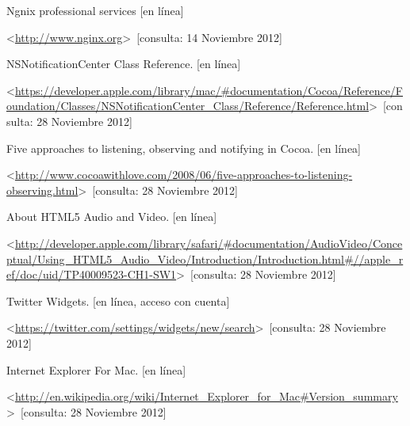 \begin{thebibliography}{99}
\begin{sloppypar}
Ngnix professional services [en línea]\

\textless \url{http://www.nginx.org}\textgreater \ [consulta: 14 Noviembre 2012]

NSNotificationCenter Class Reference. [en línea]\

\textless \url{https://developer.apple.com/library/mac/#documentation/Cocoa/Reference/Foundation/Classes/NSNotificationCenter_Class/Reference/Reference.html}\textgreater \ [consulta: 28 Noviembre 2012]

Five approaches to listening, observing and notifying in Cocoa. [en línea]\

\textless \url{http://www.cocoawithlove.com/2008/06/five-approaches-to-listening-observing.html}\textgreater \ [consulta: 28 Noviembre 2012]

About HTML5 Audio and Video. [en línea]\

\textless \url{http://developer.apple.com/library/safari/#documentation/AudioVideo/Conceptual/Using_HTML5_Audio_Video/Introduction/Introduction.html#//apple_ref/doc/uid/TP40009523-CH1-SW1}\textgreater \ [consulta: 28 Noviembre 2012]

Twitter Widgets. [en línea, acceso con cuenta]\

\textless \url{https://twitter.com/settings/widgets/new/search}\textgreater \ [consulta: 28 Noviembre 2012]

Internet Explorer For Mac. [en línea]\

\textless \url{http://en.wikipedia.org/wiki/Internet_Explorer_for_Mac#Version_summary}\textgreater \ [consulta: 28 Noviembre 2012]







\end{sloppypar}
\end{thebibliography}
